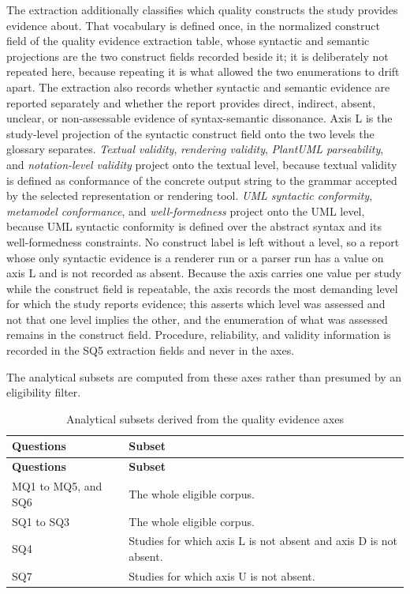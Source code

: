 The extraction additionally classifies which quality constructs the study provides evidence about. That vocabulary is defined once, in the normalized construct field of the quality evidence extraction table, whose syntactic and semantic projections are the two construct fields recorded beside it; it is deliberately not repeated here, because repeating it is what allowed the two enumerations to drift apart. The extraction also records whether syntactic and semantic evidence are reported separately and whether the report provides direct, indirect, absent, unclear, or non-assessable evidence of syntax-semantic dissonance. Axis L is the study-level projection of the syntactic construct field onto the two levels the glossary separates. \textit{Textual validity}, \textit{rendering validity}, \textit{PlantUML parseability}, and \textit{notation-level validity} project onto the textual level, because textual validity is defined as conformance of the concrete output string to the grammar accepted by the selected representation or rendering tool. \textit{UML syntactic conformity}, \textit{metamodel conformance}, and \textit{well-formedness} project onto the UML level, because UML syntactic conformity is defined over the abstract syntax and its well-formedness constraints. No construct label is left without a level, so a report whose only syntactic evidence is a renderer run or a parser run has a value on axis L and is not recorded as absent. Because the axis carries one value per study while the construct field is repeatable, the axis records the most demanding level for which the study reports evidence; this asserts which level was assessed and not that one level implies the other, and the enumeration of what was assessed remains in the construct field. Procedure, reliability, and validity information is recorded in the SQ5 extraction fields and never in the axes.

The analytical subsets are computed from these axes rather than presumed by an eligibility filter.

\begin{longtable}{p{} p{}}
\caption{Analytical subsets derived from the quality evidence axes}
\label{tab:protocol_analytical_subsets}\\
\toprule
\textbf{Questions} & \textbf{Subset} \\
\midrule
\endfirsthead
\toprule
\textbf{Questions} & \textbf{Subset} \\
\midrule
\endhead
MQ1 to MQ5, and SQ6 & The whole eligible corpus. \\
SQ1 to SQ3 & The whole eligible corpus. \\
SQ4 & Studies for which axis L is not absent and axis D is not absent. \\
SQ7 & Studies for which axis U is not absent. \\
\bottomrule
\end{longtable}

